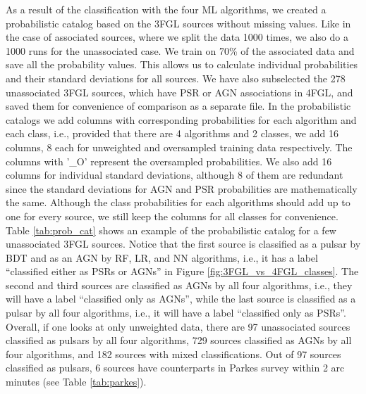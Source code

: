 As a result of the classification with the four ML algorithms,
we created a probabilistic catalog based on the 3FGL sources without missing values. Like in the case of associated sources, where we split the data 1000 times, we also do a 1000 runs for the unassociated case. We train on 70\% of the associated data and save all the probability values. This allows us to calculate individual probabilities and their standard deviations for all sources.
We have also subselected the 278 unassociated 3FGL sources, which have PSR or AGN associations in 4FGL,
and saved them for convenience of comparison as a separate file.
In the probabilistic catalogs we add columns with corresponding probabilities for each algorithm and each class,
i.e., provided that there are 4 algorithms and 2 classes, we add 16 columns, 8 each for unweighted and oversampled training data respectively. The columns with '\_O' represent the oversampled probabilities. We also add 16 columns for individual standard deviations, although 8 of them are redundant since the standard deviations for AGN and PSR probabilities are mathematically the same.
Although the class probabilities for each algorithms should add up to one for every source, we still keep the columns for all classes for convenience.
Table \ref{tab:prob_cat} shows an example of the probabilistic catalog for a few unassociated 3FGL sources.
Notice that the first source is classified as a pulsar by BDT and as an AGN by RF, LR, and NN algorithms,
i.e., it has a label ``classified either as PSRs or AGNs'' in Figure \ref{fig:3FGL_vs_4FGL_classes}.
The second and third sources are classified as AGNs by all four algorithms, i.e., they will have a label
``classified only as AGNs'',
while the last source is classified as a pulsar by all four algorithms, i.e., it will have a label
``classified only as PSRs''.
Overall, if one looks at only unweighted data, there are 97 unassociated sources classified as pulsars by all four algorithms, 729 sources classified as AGNs by all four algorithms, and 182 sources with mixed classifications.
Out of 97 sources classified as pulsars, 6 sources have counterparts in Parkes survey \cite{Camilo2015} within 2 arc minutes (see Table \ref{tab:parkes}).

